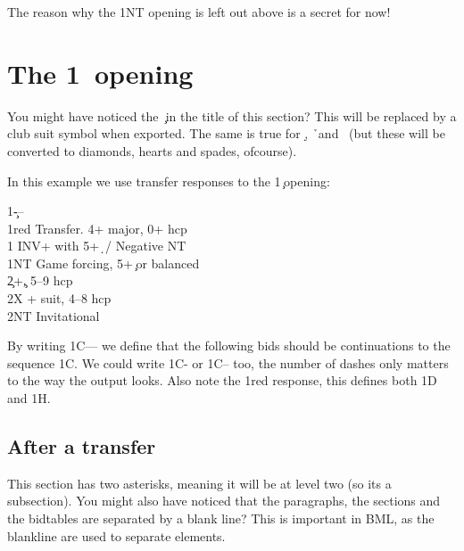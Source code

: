 \documentclass[a4paper]{article}
\begin{document}
The reason why the 1NT opening is left out above is a secret for
now!

\section{The 1\pdfc\ opening}

You might have noticed the \c\ in the title of this section? This
will be replaced by a club suit symbol when exported. The same is
true for \d, \h\ and \s\ (but these will be converted to diamonds,
hearts and spades, ofcourse).

In this example we use transfer responses to the 1\c\ opening:

\begin{bidtable}
1\c---\\
1red \> Transfer. 4+ major, 0+ hcp\\
1\s \> INV+ with 5+\d\ / Negative NT\\
1NT \> Game forcing, 5+\c\ or balanced\\
2\c {}+\c, 5--9 hcp\\
2X + suit, 4--8 hcp\\
2NT \> Invitational
\end{bidtable}

By writing 1C--- we define that the following bids should be
continuations to the sequence 1C. We could write 1C- or 1C-- too,
the number of dashes only matters to the way the output looks. Also
note the 1red response, this defines both 1D and 1H.

\subsection{After a transfer}

This section has two asterisks, meaning it will be at level two
(so its a subsection). You might also have noticed that the
paragraphs, the sections and the bidtables are separated by a
blank line? This is important in BML, as the blankline are used to
separate elements.
\end{document}
